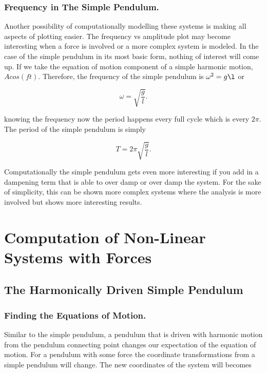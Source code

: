 \documentclass[runningheads]{llncs}
\begin{document}
\subsubsection{Frequency in The Simple Pendulum.}

Another possibility of computationally modelling these systems is making all aspects of plotting easier. The frequency vs amplitude plot may become interesting when a force is involved or a more complex system is modeled. In the case of the simple pendulum in its most basic form, nothing of interest will come up. If we take the equation of motion component of a simple harmonic motion, $Acos(ft)$. Therefore, the frequency of the simple pendulum is $\omega^{2} = g\l$ or

$$
\omega = \sqrt{\frac{g}{l}}.
$$

knowing the frequency now the period happens every full cycle which is every $2 \pi$. The period of the simple pendulum is simply 

$$
T = 2\pi \sqrt{\frac{g}{l}}.
$$

Computationally the simple pendulum gets even more interesting if you add in a dampening term that is able to over damp or over damp the system. For the sake of simplicity, this can be shown more complex systems where the analysis is more involved but shows more interesting results.

%
%

\section{Computation of Non-Linear Systems with Forces}
\subsection{The Harmonically Driven Simple Pendulum}

\subsubsection{Finding the Equations of Motion.}

Similar to the simple pendulum, a pendulum that is driven with harmonic motion from the pendulum connecting point changes our expectation of the equation of motion. For a pendulum with some force the coordinate transformations from a simple pendulum will change. The new coordinates of the system will becomes
\end{document}
